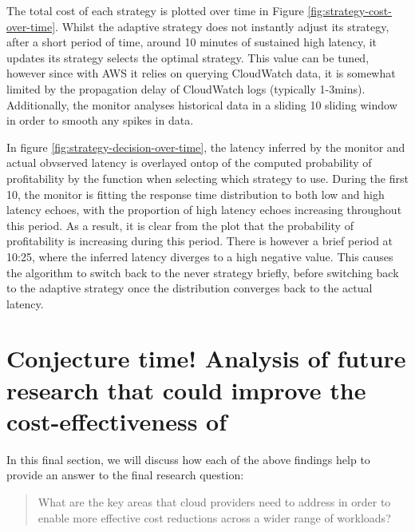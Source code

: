 The total cost of each strategy is plotted over time in Figure \ref{fig:strategy-cost-over-time}. Whilst the adaptive strategy does not instantly adjust its strategy, after a short period of time, around 10 minutes of sustained high latency, it updates its strategy selects the optimal strategy. This value can be tuned, however since with AWS it relies on querying CloudWatch data, it is somewhat limited by the propagation delay of CloudWatch logs (typically 1-3mins). Additionally, the monitor analyses historical data in a sliding \SI{10}{\min} sliding window in order to smooth any spikes in data.

\begin{figure*}
    \begin{center}
        
    \end{center}
    \caption{Strategy cost over time.}
    \label{fig:strategy-cost-over-time}
\end{figure*}

In figure \ref{fig:strategy-decision-over-time}, the latency inferred by the monitor and actual obvserved latency is overlayed ontop of the computed probability of profitability by the function when selecting which strategy to use. During the first \SI{10}{\min}, the monitor is fitting the response time distribution to both low and high latency echoes, with the proportion of high latency echoes increasing throughout this period. As a result, it is clear from the plot that the probability of profitability is increasing during this period. There is however a brief period at 10:25, where the inferred latency diverges to a high negative value. This causes the algorithm to switch back to the never strategy briefly, before switching back to the adaptive strategy once the distribution converges back to the actual latency.

\begin{figure*}
    \begin{center}
        
    \end{center}
    \caption{Strategy cost over time.}
    \label{fig:strategy-decision-over-time}
\end{figure*}

\section{Conjecture time! Analysis of future research that could improve the cost-effectiveness of \faaas{}}
In this final section, we will discuss how each of the above findings help to provide an answer to the final research question: \blockquote{What are the key areas that cloud providers need to address in order to enable more effective cost reductions across a wider range of \faas{} workloads?}.

